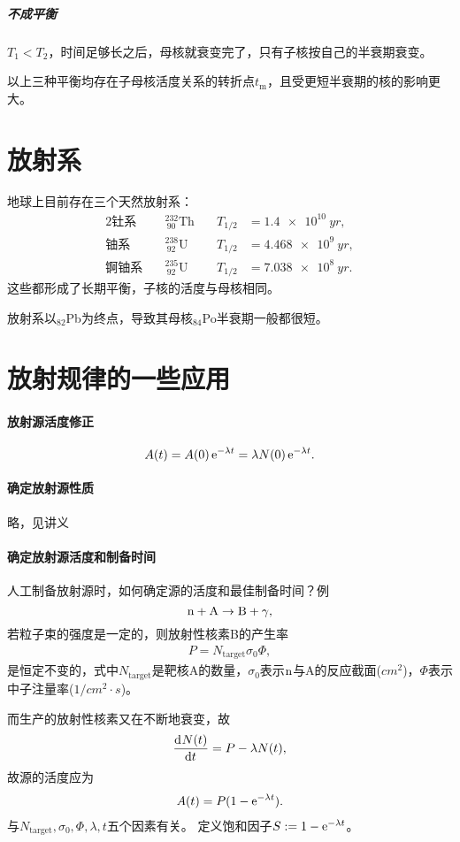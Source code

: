 \subparagraph{不成平衡}$T_1<T_2$，时间足够长之后，母核就衰变完了，只有子核按自己的半衰期衰变。

以上三种平衡均存在子母核活度关系的转折点$t_\mathrm m$，且受更短半衰期的核的影响更大。

\section{放射系}

地球上目前存在三个天然放射系：
\begin{alignat*}{2}
	\text{钍系}\quad&^{232}_{~90}\mathrm{Th}&\quad T_{1/2}&=\SI{1.4e10}{yr},\\
	\text{铀系}\quad&^{238}_{~92}\mathrm{U}&\quad T_{1/2}&=\SI{4.468e9}{yr},\\
	\text{锕铀系}\quad&^{235}_{~92}\mathrm{U}&\quad T_{1/2}&=\SI{7.038e8}{yr}.
\end{alignat*}
这些都形成了长期平衡，子核的活度与母核相同。

放射系以$_{82}$Pb为终点，导致其母核$_{84}$Po半衰期一般都很短。

\section{放射规律的一些应用}

\paragraph{放射源活度修正}
\[
	A(t)=A(0)\mathop{}\!\mathrm{e}^{-\lambda t}=\lambda N(0)\mathop{}\!\mathrm{e}^{-\lambda t}.
\]
\paragraph{确定放射源性质}略，见讲义
\paragraph{确定放射源活度和制备时间}人工制备放射源时，如何确定源的活度和最佳制备时间？例
\[
	\mathrm n+\mathrm{A}\to\mathrm{B}+\gamma,
\]
若粒子束的强度是一定的，则放射性核素B的产生率
\begin{align}
	P=N_{\mathrm{target}}\sigma_0\Phi,
\end{align}
是恒定不变的，式中$N_{\mathrm{target}}$是靶核A的数量，$\sigma_0$表示$\mathrm n$与A的反应截面($\si{cm^2}$)，$\Phi$表示中子注量率($\si{1/cm^2\cdot s}$)。

而生产的放射性核素又在不断地衰变，故
\[
	\frac{\mathrm{d}^{{}}N(t)}{\mathrm{d}{t}^{{}}}=P-\lambda N(t),
\]
故源的活度应为
\begin{align}
	A(t)=P(1-\mathop{}\!\mathrm{e}^{-\lambda t}).
\end{align}
与$N_{\mathrm{target}},\sigma_0,\Phi,\lambda,t$五个因素有关。
定义饱和因子$S:=1-\mathop{}\!\mathrm{e}^{-\lambda t}$。
